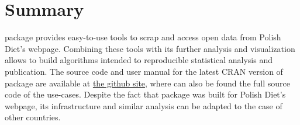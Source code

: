 \section{Summary}

 package provides easy-to-use tools to scrap and access open data from Polish Diet's webpage. Combining these tools with its further analysis and visualization
allows to build algorithms intended to reproducible statistical analysis and publication. The source code and user manual for the latest CRAN version of  package are available at \href{https://github.com/mi2-warsaw/sejmRP}{the github site}, where can also be found the full source code of the use-cases. Despite the fact that  package was built for Polish Diet's webpage, its infrastructure and similar analysis can be adapted to the case of other countries.



\address{Piotr Smuda\\
  Faculty of Mathematics and Information Science\\
  Warsaw University of Technology\\
  Koszykowa 75, 00-662 Warsaw\\
  Poland\\}

\address{Przemysław Biecek\\
  Faculty of Mathematics and Information Science\\
  Warsaw University of Technology\\
  Koszykowa 75, 00-662 Warsaw\\
  Poland\\}
